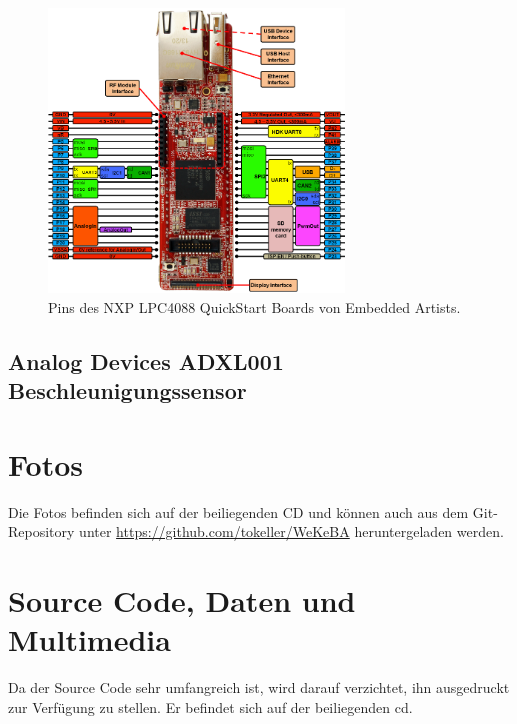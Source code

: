 \begin{figure}
	\centering		\includegraphics[width=0.7\textwidth]{images/datasheets/LPC4088_QSB_pinning_revA_800x769.png}
	\caption{Pins des NXP LPC4088 QuickStart Boards von Embedded Artists.}
	\label{fig.NXP_LPC4088_QSB_pinout}
\end{figure}



\subsection{Analog Devices ADXL001 Beschleunigungssensor}



\section{Fotos}\label{sec.foto.testaufbau}
Die Fotos befinden sich auf der beiliegenden CD und können auch aus dem Git-Repository unter \url{https://github.com/tokeller/WeKeBA} heruntergeladen werden.

\section{Source Code, Daten und Multimedia}\label{app.cd}
Da der Source Code sehr umfangreich ist, wird darauf verzichtet, ihn ausgedruckt zur Verfügung zu stellen. Er befindet sich auf der beiliegenden \gls{cd}.

